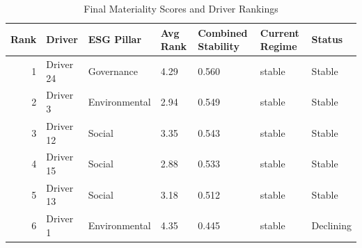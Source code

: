 \begin{table}
\caption{Final Materiality Scores and Driver Rankings}
\label{tab:final_materiality}
\begin{tabular}{rllllll}
\toprule
Rank & Driver & ESG Pillar & Avg Rank & Combined Stability & Current Regime & Status \\
\midrule
1 & Driver 24 & Governance & 4.29 & 0.560 & stable & Stable \\
2 & Driver 3 & Environmental & 2.94 & 0.549 & stable & Stable \\
3 & Driver 12 & Social & 3.35 & 0.543 & stable & Stable \\
4 & Driver 15 & Social & 2.88 & 0.533 & stable & Stable \\
5 & Driver 13 & Social & 3.18 & 0.512 & stable & Stable \\
6 & Driver 1 & Environmental & 4.35 & 0.445 & stable & Declining \\
\bottomrule
\end{tabular}
\end{table}
